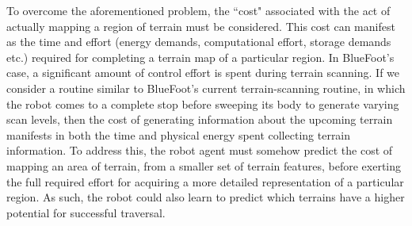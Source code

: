 	To overcome the aforementioned problem, the ``cost" associated with the act of actually mapping a region of terrain must be considered. This cost can manifest as the time and effort (energy demands, computational effort, storage demands etc.) required for completing a terrain map of a particular region. In BlueFoot's case, a significant amount of control effort is spent during terrain scanning. If we consider a routine similar to BlueFoot's current terrain-scanning routine, in which the robot comes to a complete stop before sweeping its body to generate varying scan levels, then the cost of generating information about the upcoming terrain  manifests in both the time and physical energy spent collecting terrain information. To address this, the robot agent must somehow predict the cost of mapping an area of terrain, from a smaller set of terrain features, before exerting the full required effort for acquiring a more detailed representation of a particular region. As such, the robot could also learn to predict which terrains have a higher potential for successful traversal. %